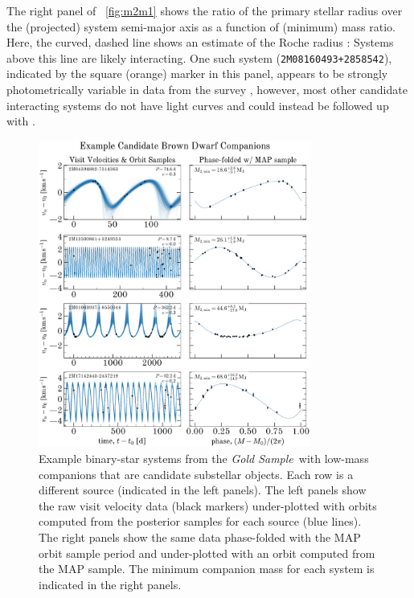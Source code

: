 \documentclass[modern]{aastex63}
\newcommand{\goldsample}{\textit{Gold Sample}}
\begin{document}
The right panel of \figurename~\ref{fig:m2m1} shows the ratio of the primary
stellar radius over the (projected) system semi-major axis as a function of
(minimum) mass ratio.
Here, the curved, dashed line shows an estimate of the Roche radius
\citep{Eggleton:1983}: Systems above this line are likely interacting.
One such system (\texttt{2M08160493+2858542}), indicated by the square (orange)
marker in this panel, appears to be strongly photometrically variable in data
from the  survey \citep{Shappee:2014, Jayasinghe:2019},
however, most other candidate interacting systems do not have 
light curves and could instead be followed up with 
\citep{Ricker:2014}.

\begin{figure}[!t]
    \begin{center}
    \includegraphics[width=0.8\textwidth]{example-brown-dwarfs.pdf}
    \end{center}
    \caption{%
    Example binary-star systems from the \goldsample\ with low-mass companions
    that are candidate substellar objects.
    Each row is a different source (indicated in the left panels).
    The left panels show the raw visit velocity data (black markers)
    under-plotted with orbits computed from the posterior samples for each
    source (blue lines).
    The right panels show the same data phase-folded with the MAP orbit sample
    period and under-plotted with an orbit computed from the MAP sample.
    The minimum companion mass for each system is indicated in the right panels.
    \label{fig:brown-dwarfs}
    }
\end{figure}
\end{document}

